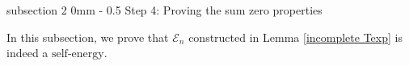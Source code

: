 \documentclass{article}
\makeatletter
\newcommand{\1}{\mathds{1}}
\numberwithin{equation}{section}
\newcommand{\al}{\alpha}
\newcommand{\wt}{\widetilde}
\renewcommand{\leq}{\leqslant}
\renewcommand{\le}{\leq}
\newcommand{\self}{\text{self-energy}}
\theoremstyle{plain} %
\newtheorem{lemma}[theorem]{Lemma}
\theoremstyle{remark}
\newtheorem{remark}[theorem]{Remark}
\newcommand{\Sdelta}{{\Sigma}_T}
\newcommand{\Sinfty}{\Sigma^{\infty}}
\newcommand{\wtSinfty}{\wt\Sigma^{\infty}}
\newcommand{\Sele}{{\mathcal E}}
\renewcommand{\subsection}{\@startsection
{subsection}%
{2}%
{0mm}%
{-\baselineskip}%
{0.5\baselineskip}%
{\normalfont\bf\itshape}} %
\makeatother
\begin{document}
%
 

 



\subsection{Step 4: Proving the sum zero properties}\label{sec sumzero1} 

In this subsection, we prove that $\Sele_n$ constructed in Lemma \ref{incomplete Texp} is indeed a $\self$. %
\end{document}
